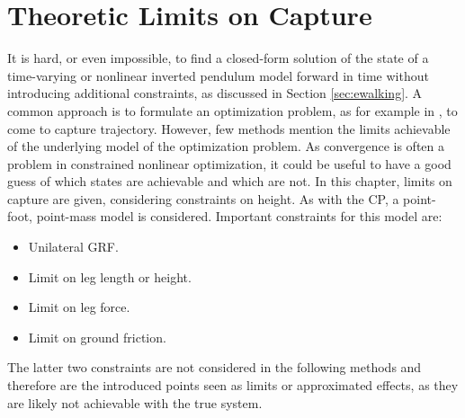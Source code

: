 %
\chapter{Theoretic Limits on Capture}
It is hard, or even impossible, to find a closed-form solution of the state of a time-varying or nonlinear inverted pendulum model forward in time without introducing additional constraints, as discussed in Section \ref{sec:ewalking}. A common approach is to formulate an optimization problem, as for example in \cite{caron2018capturability}, to come to capture trajectory. However, few methods mention the limits achievable of the underlying model of the optimization problem. As convergence is often a problem in constrained nonlinear optimization, it could be useful to have a good guess of which states are achievable and which are not. In this chapter, limits on capture are given, considering constraints on height. As with the \ac{CP}, a point-foot, point-mass model is considered. Important constraints for this model are:
\begin{itemize}
	\item Unilateral \ac{GRF}.
	\item Limit on leg length or height.
	\item Limit on leg force.
	\item Limit on ground friction.
\end{itemize}
The latter two constraints are not considered in the following methods and therefore are the introduced points seen as limits or approximated effects, as they are likely not achievable with the true system.

